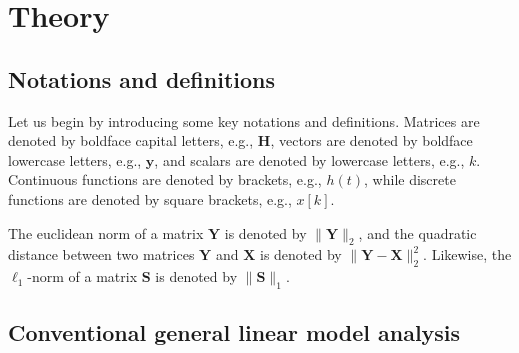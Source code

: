 
\section{Theory}


\subsection{Notations and definitions}

Let us begin by introducing some key notations and definitions. Matrices are denoted by boldface capital letters, e.g., $\mathbf{H}$, vectors are denoted by boldface lowercase letters, e.g., $\mathbf{y}$, and scalars are denoted by lowercase letters, e.g., $k$. Continuous functions are denoted by brackets, e.g., $h(t)$, while discrete functions are denoted by square brackets, e.g., $x[k]$.

The euclidean norm of a matrix $\mathbf{Y}$ is denoted by $\| \mathbf{Y} \|_2$, and the quadratic distance between two matrices $\mathbf{Y}$ and $\mathbf{X}$ is denoted by $\| \mathbf{Y} - \mathbf{X} \|_2^2$. Likewise, the $\ell_1$-norm of a matrix $\mathbf{S}$ is denoted by $\| \mathbf{S} \|_1$.

\subsection{Conventional general linear model analysis}

